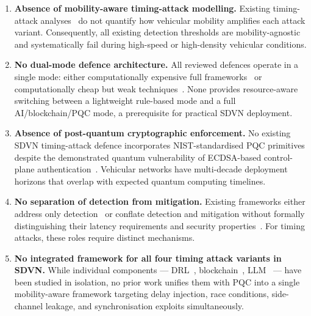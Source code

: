 \begin{enumerate}
\item \textbf{Absence of mobility-aware timing-attack modelling.}
  Existing timing-attack analyses~\cite{Xu2015Race,Cao2018CrossPath,Shoaib2021Timing,Arif2019Timing} do not quantify how
  vehicular mobility amplifies each attack variant. Consequently, all
  existing detection thresholds are mobility-agnostic and systematically
  fail during high-speed or high-density vehicular conditions.

\item \textbf{No dual-mode defence architecture.}
  All reviewed defences operate in a single mode: either computationally
  expensive full frameworks~\cite{Kanimozhi2022DRL,alkhamisi2024bcs,satpathy2025cloud} or
  computationally cheap but weak techniques~\cite{Shoaib2023Detection,Shoaib2021Timing}. None provides
  resource-aware switching between a lightweight rule-based mode and a
  full AI/blockchain/PQC mode, a prerequisite for practical SDVN deployment.

\item \textbf{Absence of post-quantum cryptographic enforcement.}
  No existing SDVN timing-attack defence incorporates NIST-standardised
  PQC primitives despite the demonstrated quantum vulnerability of
  ECDSA-based control-plane authentication~\cite{rahman2025quantum,cao2025quantum}. Vehicular networks have
  multi-decade deployment horizons that overlap with expected quantum
  computing timelines.

\item \textbf{No separation of detection from mitigation.}
  Existing frameworks either address only detection~\cite{Shoaib2023Detection,Shoaib2021Timing,Arif2019Timing} or
  conflate detection and mitigation without formally distinguishing their
  latency requirements and security properties~\cite{Mozumder2020Blockchain,Derhab2021BMC}. For timing
  attacks, these roles require distinct mechanisms.

\item \textbf{No integrated framework for all four timing attack variants
  in SDVN.} While individual components --- DRL~\cite{Kanimozhi2022DRL}, blockchain~\cite{Mozumder2020Blockchain},
  LLM~\cite{llmguardian2026} --- have been studied in isolation, no prior
  work unifies them with PQC into a single mobility-aware framework
  targeting delay injection, race conditions, side-channel leakage, and
  synchronisation exploits simultaneously.


\end{enumerate}
